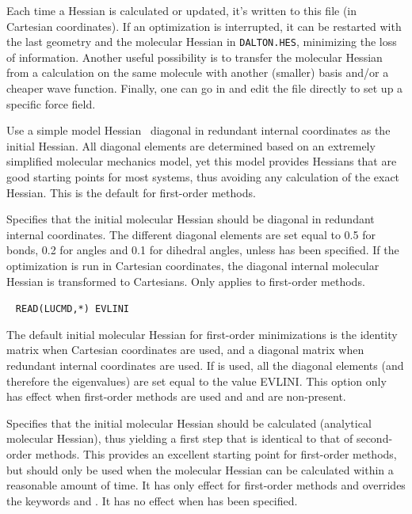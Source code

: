 \begin{description}
Each time a Hessian is calculated or updated,
it's written to this file (in Cartesian coordinates). If an
optimization is interrupted, it can be restarted with the
last geometry and the molecular Hessian in \verb|DALTON.HES|, minimizing the
loss of information. Another useful possibility is to transfer
the molecular Hessian from a calculation on the same molecule with another
(smaller) basis and/or a cheaper wave function. Finally, one can go in
and edit the file directly to set up a specific force field.

\item[\Key{INIMOD}]
Use a simple model Hessian~\cite{rlabgkpamcpl241} diagonal in redundant
internal coordinates as the initial Hessian. All diagonal elements are
determined based on an extremely simplified molecular mechanics model,
yet this model provides Hessians that are good starting points for
most systems, thus avoiding any calculation of the exact Hessian. This
is the default for first-order methods.

\item[\Key{INIRED}]
Specifies that the initial molecular Hessian
should be diagonal in redundant internal coordinates. The different diagonal
elements are set equal to 0.5 for bonds, 0.2 for angles and 0.1 for
dihedral angles, unless  has been specified. If the
optimization is run in Cartesian coordinates, the diagonal internal
molecular Hessian is transformed to Cartesians. Only applies to first-order
methods.

\item[\Key{INITEV}]\verb| | \newline
\verb|READ(LUCMD,*) EVLINI| 

The default initial molecular Hessian for first-order
minimizations is the
identity matrix when Cartesian coordinates are used, and a diagonal
matrix when redundant internal coordinates are used. If 
is used, all the diagonal elements (and therefore the eigenvalues) are
set equal to the value EVLINI. This option only has effect when
first-order methods are used and  and  are
non-present.

\item[\Key{INITHE}]
Specifies that the initial molecular Hessian should be
calculated (analytical molecular Hessian), thus yielding a first step that is
identical to that of second-order methods. This provides an excellent starting
point for first-order methods, but should only be used when the
molecular Hessian can be calculated within a reasonable amount of time. It has only
effect for first-order methods and overrides the keywords
 and . It has no effect when  has
been specified.


\end{description}
